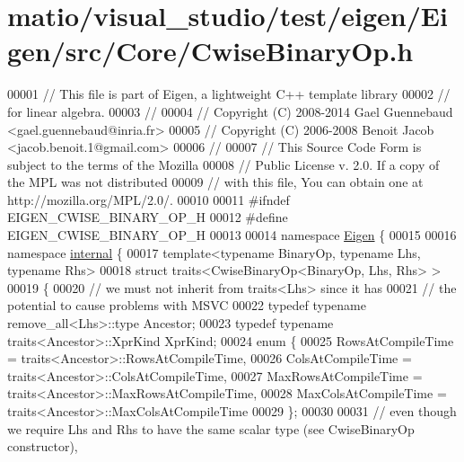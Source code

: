 \hypertarget{matio_2visual__studio_2test_2eigen_2_eigen_2src_2_core_2_cwise_binary_op_8h_source}{}\section{matio/visual\+\_\+studio/test/eigen/\+Eigen/src/\+Core/\+Cwise\+Binary\+Op.h}
\label{matio_2visual__studio_2test_2eigen_2_eigen_2src_2_core_2_cwise_binary_op_8h_source}

\begin{DoxyCode}
00001 \textcolor{comment}{// This file is part of Eigen, a lightweight C++ template library}
00002 \textcolor{comment}{// for linear algebra.}
00003 \textcolor{comment}{//}
00004 \textcolor{comment}{// Copyright (C) 2008-2014 Gael Guennebaud <gael.guennebaud@inria.fr>}
00005 \textcolor{comment}{// Copyright (C) 2006-2008 Benoit Jacob <jacob.benoit.1@gmail.com>}
00006 \textcolor{comment}{//}
00007 \textcolor{comment}{// This Source Code Form is subject to the terms of the Mozilla}
00008 \textcolor{comment}{// Public License v. 2.0. If a copy of the MPL was not distributed}
00009 \textcolor{comment}{// with this file, You can obtain one at http://mozilla.org/MPL/2.0/.}
00010 
00011 \textcolor{preprocessor}{#ifndef EIGEN\_CWISE\_BINARY\_OP\_H}
00012 \textcolor{preprocessor}{#define EIGEN\_CWISE\_BINARY\_OP\_H}
00013 
00014 \textcolor{keyword}{namespace }\hyperlink{namespace_eigen}{Eigen} \{
00015 
00016 \textcolor{keyword}{namespace }\hyperlink{namespaceinternal}{internal} \{
00017 \textcolor{keyword}{template}<\textcolor{keyword}{typename} BinaryOp, \textcolor{keyword}{typename} Lhs, \textcolor{keyword}{typename} Rhs>
00018 \textcolor{keyword}{struct }traits<CwiseBinaryOp<BinaryOp, Lhs, Rhs> >
00019 \{
00020   \textcolor{comment}{// we must not inherit from traits<Lhs> since it has}
00021   \textcolor{comment}{// the potential to cause problems with MSVC}
00022   \textcolor{keyword}{typedef} \textcolor{keyword}{typename} remove\_all<Lhs>::type Ancestor;
00023   \textcolor{keyword}{typedef} \textcolor{keyword}{typename} traits<Ancestor>::XprKind XprKind;
00024   \textcolor{keyword}{enum} \{
00025     RowsAtCompileTime = traits<Ancestor>::RowsAtCompileTime,
00026     ColsAtCompileTime = traits<Ancestor>::ColsAtCompileTime,
00027     MaxRowsAtCompileTime = traits<Ancestor>::MaxRowsAtCompileTime,
00028     MaxColsAtCompileTime = traits<Ancestor>::MaxColsAtCompileTime
00029   \};
00030 
00031   \textcolor{comment}{// even though we require Lhs and Rhs to have the same scalar type (see CwiseBinaryOp constructor),}

\end{DoxyCode}
